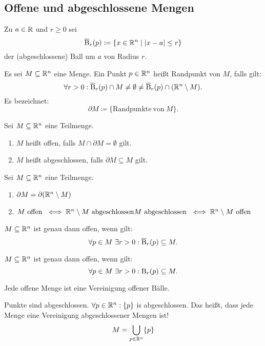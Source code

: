 \subsection{Offene und abgeschlossene Mengen}
Zu $a\in\mathbb{R}$ und $r\ge0$ sei
\[
    \operatorname{\overline{B}}_r(p) \coloneqq \{x\in\mathbb{R}^n \mid \vert x - a \vert \le r\}
\]
der (abgeschlossene) Ball um $a$ von Radius $r$.
\begin{defn}[Randpunkt]
    Es sei $M\subseteq\mathbb{R}^n$ eine Menge. Ein Punkt $p\in\mathbb{R}^n$ heißt Randpunkt von $M$, falls gilt:
    \[
        \forall r>0: \operatorname{\overline{B}}_r(p)\cap M \neq \emptyset \neq \operatorname{\overline{B}}_r(p)\cap (\mathbb{R}^n\setminus M).
    \]
    Es bezeichnet:
    \[
        \partial M \coloneqq \{\mathrm{Randpunkte\ von\ } M\}.
    \]
\end{defn}
\begin{defn} Sei $M\subseteq \mathbb{R}^n$ eine Teilmenge.
    \begin{enumerate}
        \item $M$ heißt offen, falls $M\cap \partial M = \emptyset$ gilt.
        \item $M$ heißt abgeschlossen, falls $\partial M \subseteq M$ gilt.
    \end{enumerate}
\end{defn}
\begin{lemma} Sei $M\subseteq \mathbb{R}^n$ eine Teilmenge.
    \begin{enumerate}
        \item $\partial M = \partial (\mathbb{R}^n\setminus M)$
        \item \(
                  M \mathrm{\ offen\ } \iff \mathbb{R}^n\setminus M \mathrm{\ abgeschlossen}\\
                  M \mathrm{\ abgeschlossen\ } \iff \mathbb{R}^n\setminus M \mathrm{\ offen}
        \)
    \end{enumerate}
\end{lemma}
\begin{lemma}
    $M\subseteq \mathbb{R}^n$ ist genau dann offen, wenn gilt:
    \[
        \forall p\in M\ \exists r > 0: \operatorname{\overline{B}}_r(p) \subseteq M.
    \]
\end{lemma}
\begin{lemma}
    $M\subseteq \mathbb{R}^n$ ist genau dann offen, wenn gilt:
    \[
        \forall p\in M\ \exists r > 0: \operatorname{B}_r(p) \subseteq M.
    \]
\end{lemma}
\begin{kor}
    Jede offene Menge ist eine Vereinigung offener Bälle.
\end{kor}
\begin{bem}
    \glqq Punkte sind abgeschlossen.\grqq{} \(\forall p\in\mathbb{R}^n: \{p\}\) is abgeschlossen. Das heißt, dass jede Menge eine Vereinigung abgeschlossener Mengen ist!
    \[
        M = \bigcup_{p\in\mathbb{R}^n}\{p\}
    \]
\end{bem}
